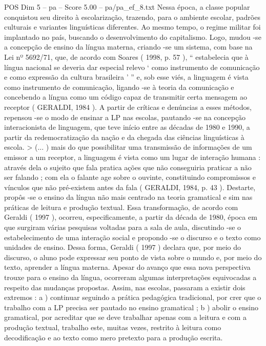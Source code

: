 \begin{textsample}{POS Dim 5 – pa – Score 5.00 – pa/pa\_ef\_8.txt}
Nessa época, a classe popular conquistou seu direito à escolarização, trazendo, para o ambiente escolar, padrões culturais e variantes linguísticas diferentes.
Ao mesmo tempo, o regime militar foi implantado no país, buscando o desenvolvimento do capitalismo.
Logo, mudou -se a concepção de ensino da língua materna, criando -se um sistema, com base na Lei nº 5692/71, que, de acordo com Soares ( 1998, p. 57 ), “ estabelecia que à língua nacional se deveria dar especial relevo ‘ como instrumento de comunicação e como expressão da cultura brasileira ’ ” e, sob esse viés, a linguagem é vista como instrumento de comunicação, ligando -se à teoria da comunicação e concebendo a língua como um código capaz de transmitir certa mensagem ao receptor ( GERALDI, 1984 ).
A partir de críticas e denúncias a esses métodos, repensou -se o modo de ensinar a LP nas escolas, pautando -se na concepção interacionista de linguagem, que teve início entre as décadas de 1980 e 1990, a partir da redemocratização da nação e da chegada das ciências linguísticas à escola. > (... ) mais do que possibilitar uma transmissão de informações de um emissor a um receptor, a linguagem é vista como um lugar de interação humana : através dela o sujeito que fala pratica ações que não conseguiria praticar a não ser falando ; com ela o falante age sobre o ouvinte, constituindo compromissos e vínculos que não pré-existem antes da fala ( GERALDI, 1984, p. 43 ).
Destarte, propôs -se o ensino da língua não mais centrado na teoria gramatical e sim nas práticas de leitura e produção textual.
Essa transformação, de acordo com Geraldi ( 1997 ), ocorreu, especificamente, a partir da década de 1980, época em que surgiram várias pesquisas voltadas para a sala de aula, discutindo -se o estabelecimento de uma interação social e propondo -se o discurso e o texto como unidades de ensino.
Dessa forma, Geraldi ( 1997 ) declara que, por meio do discurso, o aluno pode expressar seu ponto de vista sobre o mundo e, por meio do texto, aprender a língua materna.
Apesar do avanço que essa nova perspectiva trouxe para o ensino da língua, ocorreram algumas interpretações equivocadas a respeito das mudanças propostas.
Assim, nas escolas, passaram a existir dois extremos : a ) continuar seguindo a prática pedagógica tradicional, por crer que o trabalho com a LP precisa ser pautado no ensino gramatical ; b ) abolir o ensino gramatical, por acreditar que se deve trabalhar apenas com a leitura e com a produção textual, trabalho este, muitas vezes, restrito à leitura como decodificação e ao texto como mero pretexto para a produção escrita.

\end{textsample}
